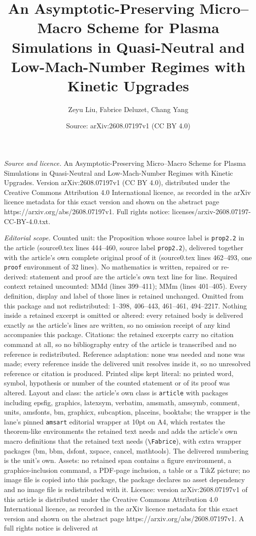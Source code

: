 \documentclass[10pt,a4paper]{amsart}
\title[An Asymptotic-Preserving Micro--Macro Scheme for Plasma Simu]{An Asymptotic-Preserving Micro--Macro Scheme for Plasma Simulations in Quasi-Neutral and Low-Mach-Number Regimes with Kinetic Upgrades}
\author{Zeyu Liu, Fabrice Deluzet, Chang Yang}
\date{Source: arXiv:2608.07197v1 (CC BY 4.0)}
\begin{document}
\maketitle

\noindent\emph{Source and licence.} An Asymptotic-Preserving Micro--Macro Scheme for Plasma Simulations in Quasi-Neutral and Low-Mach-Number Regimes with Kinetic Upgrades. Version arXiv:2608.07197v1 (CC BY 4.0), distributed under the Creative Commons Attribution 4.0 International licence, as recorded in the arXiv licence metadata for this exact version and shown on the abstract page https://arxiv.org/abs/2608.07197v1. Full rights notice: licenses/arxiv-2608.07197-CC-BY-4.0.txt.\par\smallskip

\noindent\textit{Editorial scope.} Counted unit: the Proposition whose source label is \texttt{prop2.2} in the article (source0.tex lines 444--460, source label \texttt{prop2.2}), delivered together with the article's own complete original proof of it (source0.tex lines 462--493, one \texttt{proof} environment of 32 lines). No mathematics is written, repaired or re-derived: statement and proof are the article's own text line for line. Required context retained uncounted: MMd (lines 399--411); MMm (lines 401--405). Every definition, display and label of those lines is retained unchanged. Omitted from this package and not redistributed: 1--398, 406--443, 461--461, 494--2217. Nothing inside a retained excerpt is omitted or altered: every retained body is delivered exactly as the article's lines are written, so no omission receipt of any kind accompanies this package. Citations: the retained excerpts carry no citation command at all, so no bibliography entry of the article is transcribed and no reference is redistributed. Reference adaptation: none was needed and none was made; every reference inside the delivered unit resolves inside it, so no unresolved reference or citation is produced. Printed slips kept literal: no printed word, symbol, hypothesis or number of the counted statement or of its proof was altered. Layout and class: the article's own class is \texttt{article} with packages including epsfig, graphics, latexsym, verbatim, amsmath, amssymb, comment, units, amsfonts, bm, graphicx, subcaption, placeins, booktabs; the wrapper is the lane's pinned \texttt{amsart} editorial wrapper at 10pt on A4, which restates the theorem-like environments the retained text needs and adds the article's own macro definitions that the retained text needs (\texttt{\textbackslash Fabrice}), with extra wrapper packages (bm, bbm, dsfont, xspace, cancel, mathtools). The delivered numbering is the unit's own. Assets: no retained span contains a figure environment, a graphics-inclusion command, a PDF-page inclusion, a table or a TikZ picture; no image file is copied into this package, the package declares no asset dependency and no image file is redistributed with it. Licence: version arXiv:2608.07197v1 of this article is distributed under the Creative Commons Attribution 4.0 International licence, as recorded in the arXiv licence metadata for this exact version and shown on the abstract page https://arxiv.org/abs/2608.07197v1. A full rights notice is delivered at 
\end{document}
